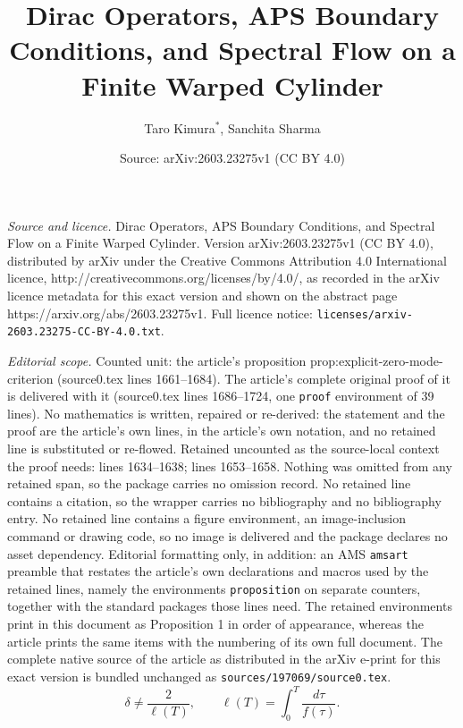 \documentclass[10pt,a4paper]{amsart}
\title{Dirac Operators, APS Boundary Conditions, and Spectral Flow on a Finite Warped Cylinder}
\author{Taro Kimura$^*$, Sanchita Sharma}
\date{Source: arXiv:2603.23275v1 (CC BY 4.0)}
\begin{document}
\maketitle

\noindent\emph{Source and licence.} Dirac Operators, APS Boundary Conditions, and Spectral Flow on a Finite Warped Cylinder. Version arXiv:2603.23275v1 (CC BY 4.0), distributed by arXiv under the Creative Commons Attribution 4.0 International licence, http://creativecommons.org/licenses/by/4.0/, as recorded in the arXiv licence metadata for this exact version and shown on the abstract page https://arxiv.org/abs/2603.23275v1. Full licence notice: \texttt{licenses/arxiv-2603.23275-CC-BY-4.0.txt}.\par\smallskip

\noindent\textit{Editorial scope.} Counted unit: the article's proposition prop:explicit-zero-mode-criterion (source0.tex lines 1661--1684). The article's complete original proof of it is delivered with it (source0.tex lines 1686--1724, one \texttt{proof} environment of 39 lines). No mathematics is written, repaired or re-derived: the statement and the proof are the article's own lines, in the article's own notation, and no retained line is substituted or re-flowed.  Retained uncounted as the source-local context the proof needs: lines 1634--1638; lines 1653--1658.  Nothing was omitted from any retained span, so the package carries no omission record.  No retained line contains a citation, so the wrapper carries no bibliography and no bibliography entry.  No retained line contains a figure environment, an image-inclusion command or drawing code, so no image is delivered and the package declares no asset dependency.  Editorial formatting only, in addition: an AMS \texttt{amsart} preamble that restates the article's own declarations and macros used by the retained lines, namely the environments \texttt{proposition} on separate counters, together with the standard packages those lines need.  The retained environments print in this document as Proposition 1 in order of appearance, whereas the article prints the same items with the numbering of its own full document.  The complete native source of the article as distributed in the arXiv e-print for this exact version is bundled unchanged as \texttt{sources/197069/source0.tex}.
\begin{equation}\label{eq:non-degenerate-delta}
\delta \neq \frac{2}{\ell(T)},
\qquad
\ell(T)=\int_0^T \frac{d\tau}{f(\tau)}.
\end{equation}
\end{document}
